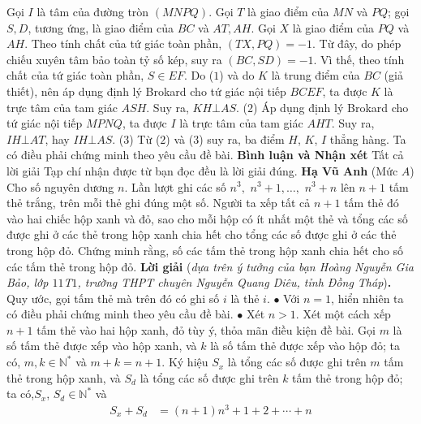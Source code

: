 \begin{multicols}{2}
	\vskip 0.05cm
	Gọi $I$ là tâm của đường tròn $(MNPQ)$.
	\vskip 0.05cm
	Gọi $T$ là giao điểm của $MN$ và $PQ$; gọi $S, D$, tương ứng, là giao điểm của $BC$ và $AT, AH$.
	\vskip 0.05cm
	Gọi $X$ là giao điểm của $PQ$ và $AH$. Theo tính chất của tứ giác toàn phần, $(TX, PQ) = -1$. Từ đây, do phép chiếu xuyên tâm bảo toàn tỷ số kép, suy ra $(BC, SD) = -1$.  Vì thế, theo tính chất của tứ giác toàn phần, $S \in EF$.
	\vskip 0.05cm
	Do ($1$) và do $K$ là trung điểm của $BC$ (giả thiết), nên áp dụng định lý Brokard cho tứ giác nội tiếp $BCEF$, ta được $K$ là trực tâm của tam giác $ASH$. Suy ra, $KH \bot AS$. \hfill ($2$)
	\vskip 0.05cm
	Áp dụng định lý Brokard cho tứ giác nội tiếp $MPNQ$, ta được $I$ là trực tâm của tam giác $AHT$. Suy ra, $IH \bot AT$, hay $IH \bot AS$. \hfill ($3$)
	\vskip 0.05cm
	Từ ($2$) và ($3$) suy ra, ba điểm $H$, $K$, $I$ thẳng hàng. Ta có điều phải chứng minh theo yêu cầu đề bài.
	\vskip 0.05cm
	\textbf{\color{thachthuctoanhoc}Bình luận và Nhận xét}
	\vskip 0.05cm
	Tất cả lời giải Tạp chí nhận được từ bạn đọc đều là lời giải đúng.
	\vskip 0.1cm
	\hfill	\textbf{\color{thachthuctoanhoc}Hạ Vũ Anh}
	\vskip 0.1cm
	(Mức $A$) Cho số nguyên dương $n$. Lần lượt ghi các số $n^3,$ $n^3+1,\ldots,$ $n^3+n$ lên $n+1$ tấm thẻ trắng, trên mỗi thẻ ghi đúng một số. Người ta xếp tất cả $n+1$ tấm thẻ đó vào hai chiếc hộp xanh và đỏ, sao cho mỗi hộp có ít nhất một thẻ và  tổng các số được ghi ở các thẻ trong hộp xanh chia hết cho tổng các số được ghi ở các thẻ trong hộp đỏ. Chứng minh rằng, số các tấm thẻ trong hộp xanh chia hết cho số các tấm thẻ trong hộp đỏ.
	\vskip 0.05cm
	\textbf{\color{thachthuctoanhoc}Lời giải} (\textit{dựa trên ý tưởng của bạn Hoàng Nguyễn Gia Bảo, lớp $11$T$1$, trường THPT chuyên Nguyễn Quang Diêu, tỉnh Đồng Tháp})\textbf{\color{thachthuctoanhoc}.}
	\vskip 0.05cm
	Quy ước, gọi tấm thẻ mà trên đó có ghi số $i$ là thẻ $i$.
	\vskip 0.05cm
	$\bullet$ Với $n = 1$, hiển nhiên ta có điều phải chứng minh theo yêu cầu đề bài.
	\vskip 0.05cm
	$\bullet$ Xét $n > 1$.
	\vskip 0.05cm
	Xét một cách xếp $n + 1$ tấm thẻ vào hai hộp xanh, đỏ tùy ý, thỏa mãn điều kiện đề bài.
	\vskip 0.05cm
	Gọi $m$ là số tấm thẻ được xếp vào hộp xanh, và $k$ là số tấm thẻ được xếp vào hộp đỏ; ta có,  $m, k \in \mathbb{N^*}$ và $m + k = n + 1$.
	\vskip 0.05cm
	Ký hiệu  $S_x$ là tổng các số được ghi trên $m$ tấm thẻ trong hộp xanh, và $S_d$ là tổng các số được ghi trên $k$ tấm thẻ trong hộp đỏ; ta có,\linebreak $S_x$, $S_d \in \mathbb{N^*}$  và
	\begin{align*}
		{S_x} + {S_d} &= \left( {n + 1} \right){n^3} + 1 + 2 +  \cdots  + n \\

\end{align*}
\end{multicols}
